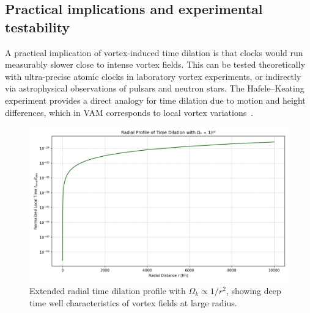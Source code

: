 \subsection{Practical implications and experimental testability}

A practical implication of vortex-induced time dilation is that clocks would run measurably slower close to intense vortex fields. This can be tested theoretically with ultra-precise atomic clocks in laboratory vortex experiments, or indirectly via astrophysical observations of pulsars and neutron stars. The Hafele–Keating experiment provides a direct analogy for time dilation due to motion and height differences, which in VAM corresponds to local vortex variations~\cite{hafele1972around}.

\begin{figure}[ht!]
    \centering
    \includegraphics[width=0.7\linewidth]{05-LogarithmicDecayLocalTime}
    \caption{Extended radial time dilation profile with $\Omega_k \propto 1/r^2$, showing deep time well characteristics of vortex fields at large radius.}
    \label{fig:NewGraph}
\end{figure}